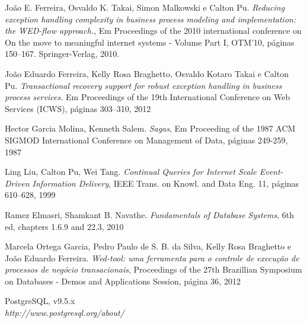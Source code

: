 \documentclass[conference]{IEEEtran}
\begin{document}
%
%
%
\begin{thebibliography}{1}

João E. Ferreira, Osvaldo K. Takai, Simon Malkowski e Calton Pu. 
\emph{Reducing exception handling complexity in business process modeling and implementation:
the WED-flow approach.}, Em Proceedings of the 2010 international conference on
On the move to meaningful internet systems - Volume Part I, OTM’10, páginas
150–167. Springer-Verlag, 2010.

João Eduardo Ferreira, Kelly Rosa Braghetto, Osvaldo Kotaro Takai e
Calton Pu.\emph{ Transactional recovery support for robust exception handling in business process
services.} Em Proceedings of the 19th International Conference on Web Services (ICWS), páginas
303–310, 2012

Hector Garcia Molina, Kenneth Salem.
\emph{Sagas}, Em Proceeding of the 1987 ACM SIGMOD International Conference on Management of Data, páginas 249-259, 1987

Ling Liu, Calton Pu, Wei Tang.
\emph{Continual Queries for Internet Scale Event-Driven Information Delivery},
IEEE Trans. on Knowl. and Data Eng. 11, páginas 610–628, 1999

Ramez Elmasri, Shamkant B. Navathe.
\emph{Fundamentals of Database Systems}, 6th ed, chapters 1.6.9 and 22.3, 2010

Marcela Ortega Garcia, Pedro Paulo de S. B. da Silva, Kelly Rosa Braghetto e João Eduardo Ferreira.
\emph{Wed-tool: uma ferramenta para o controle de execução de processos de negócio transacionais},
Proceedings of the 27th Brazillian Symposium on Databases - Demos and Applications Session, página 36, 2012

PostgreSQL, v9.5.x \\
\emph{http://www.postgresql.org/about/}

\end{thebibliography}
\end{document}
